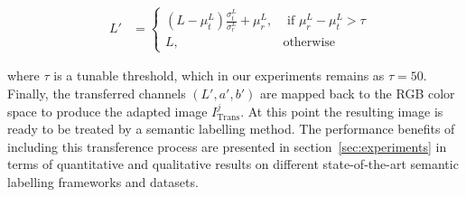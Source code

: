 \begin{ceqn}
\begin{align}
\label{reinhard2}
& L' & = \begin{cases} (L-\mu^L_t)\frac{\sigma^L_t}{\sigma^L_r}+\mu^L_r, & \text{ if } \mu^L_r - \mu^L_t > \tau  \\
L, & \text{otherwise} \end{cases} 
\end{align}
\end{ceqn}

\noindent where $\tau$ is a tunable threshold, which in our experiments remains as $\tau = 50$. Finally, the transferred channels $(L', a', b')$ are mapped back
to the RGB color space to produce the adapted image
${I}^j_\text{Trans}$. At this point the resulting image is ready to
be treated by a semantic labelling method. The performance
benefits of including this transference process are presented in
section~\ref{sec:experiments} in terms of quantitative and
qualitative results on different state-of-the-art semantic
labelling frameworks and datasets.
